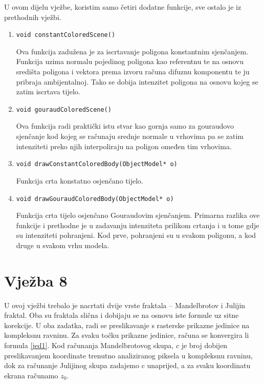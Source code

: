 \documentclass[utf8]{fer}
\begin{document}
 U ovom dijelu vježbe, koristim samo četiri dodatne funkcije, sve ostalo je iz prethodnih vježbi.

\begin{enumerate}
\item \begin{lstlisting}
void constantColoredScene()
\end{lstlisting}

Ova funkcija zadužena je za iscrtavanje poligona konstantnim sjenčanjem. Funkcija uzima normalu pojedinog poligona kao referentnu te na osnovu središta poligona i vektora prema izvoru računa difuznu komponentu te ju pribraja ambijentalnoj. Tako se dobija intenzitet poligona na osnovu kojeg se zatim iscrtava tijelo.

\item \begin{lstlisting}
void gouraudColoredScene()
\end{lstlisting}

Ova funkcija radi praktički istu stvar kao gornja samo za gouraudovo sjenčanje kod kojeg se računaju srednje normale u vrhovima pa se zatim intenziteti preko njih interpoliraju na poligon omeđen tim vrhovima.

\item \begin{lstlisting}
void drawConstantColoredBody(ObjectModel* o)
\end{lstlisting}

Funkcija crta konstatno osjenčano tijelo.

\item \begin{lstlisting}
void drawGouraudColoredBody(ObjectModel* o)
\end{lstlisting}

Funkcija crta tijelo osjenčano Gouraudovim sjenčanjem. Primarna razlika ove funkcije i prethodne je u zadavanju intenziteta prilikom crtanja i u tome gdje su intenziteti pohranjeni. Kod prve, pohranjeni su u svakom poligonu, a kod druge u svakom vrhu modela.


\end{enumerate}

\section{Vježba 8}

U ovoj vježbi trebalo je nacrtati dvije vrste fraktala -- Mandelbrotov i Julijin fraktal. Oba su fraktala slična i dobijaju se na osnovu iste formule uz sitne korekcije. U oba zadatka, radi se preslikavanje s rasterske prikazne jedinice na kompleksnu ravninu. Za svaku točku prikazne jedinice, računa se konvergira li formula \ref{jed1}. Kod računanja Mandelbrotovog skupa, $c$ je broj dobijen preslikavanjem koordinate trenutno analiziranog piksela u kompleksnu ravninu, dok za računanje Julijinog skupa zadajemo c unaprijed, a za svaku koordinatu ekrana računamo $z_{0}$.
\end{document}
